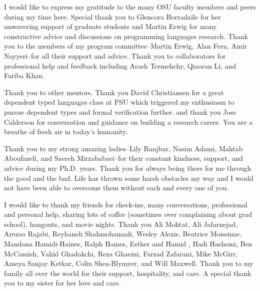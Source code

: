 I would like to express my gratitude to the many OSU faculty members and peers during my time here. 
Special thank you to Glencora Borradaile for her unwavering support 
of graduate students and Martin Erwig for many constructive advice and discussions on 
programming languages research. 
Thank you to the members of my program committee--Martin Erwig, 
Alan Fern, Amir Nayyeri--for all their support and advice. 
%
Thank you to collaborators for professional help and feedback including
Arash Termehchy, Qiaoran Li, and Fariba Khan. 

%
Thank you to other mentors. 
Thank you David Christiansen for a great dependent typed languages class at PSU
which triggered my enthusiasm to pursue dependent types and formal verification further.
and thank you Jose Calderson for conversation and guidance on building a research career. You
are a breathe of fresh air in today's humanity.
%


Thank you to my strong amazing ladies--Lily Ranjbar, 
Nasim Adami, Mahtab Aboufazeli, and Saereh Mirzababaei--for their constant kindness, 
support, and advice during my Ph.D. years. Thank you for always being there for me 
through the good and the bad. Life has thrown some harsh obstacles my way and I 
would not have been able to overcome them without each and every one of you. 
%

%
I would like to thank my friends for 
check-ins, many conversations, professional and personal help, sharing lots of coffee (sometimes over complaining about grad school), hangouts, and movie nights.
Thank you Ali Mohtat, Ali Jafarnejad, 
Arezoo Rajabi, Reyhaneh Shahmohamadi, Wesley Alexis,
Beatrice Moissinac, Mandana Hamidi-Haines, Ralph Haines, 
Esther and Hamid , Hadi Hashemi, Ben McCamish, Vahid Ghadakchi, Reza Ghaeini, Farzad Zafarani, Mike McGirr, Ameya Sanjay Ketkar, Colin Shea-Blymyer, and Will Maxwell.
%
Thank you to my family all over the world for their support, hospitality, and care.
A special thank you to my sister for her love and care. 

